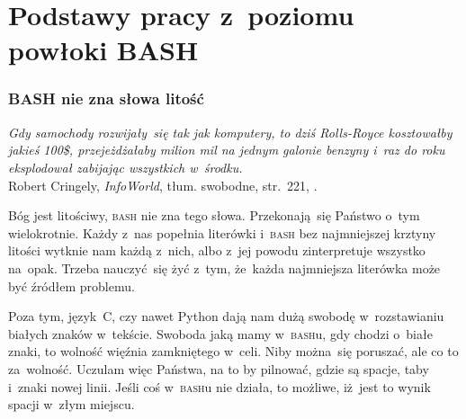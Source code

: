 \documentclass[10pt,t]{beamer}
\begin{document}
\section{Podstawy pracy z~poziomu powłoki BASH}



\begin{frame}
  \frametitle{BASH nie zna słowa litość}


  \textit{Gdy samochody rozwijały~się tak jak komputery, to dziś
    Rolls-Royce kosztowałby jakieś 100\$, przejeżdżałaby milion mil na
    jednym galonie benzyny i~raz do roku eksplodował zabijając wszystkich
    w~środku.} \\
  Robert Cringely, \textit{InfoWorld}, tłum. swobodne, str.~221,
  \parencite{Garfinkel-Weise-Strassmann-The-UNIX-HATERS-Handbook-Pub-1994}.

  Bóg jest litościwy, \textsc{bash} nie zna tego słowa. Przekonają~się
  Państwo o~tym wielokrotnie. Każdy z~nas popełnia literówki i~\textsc{bash}
  bez najmniejszej krztyny litości wytknie nam każdą z~nich, albo
  z~jej powodu zinterpretuje wszystko na~opak. Trzeba nauczyć~się
  żyć z~tym, że~każda najmniejsza literówka może być źródłem problemu.

  Poza tym, język~C, czy nawet Python dają nam dużą swobodę w~rozstawianiu
  białych znaków w~tekście. Swoboda jaką mamy w~\textsc{bash}u, gdy chodzi
  o~białe znaki, to wolność więźnia zamkniętego w~celi. Niby można~się
  poruszać, ale co to za~wolność. Uczulam więc Państwa, na to by pilnować,
  gdzie są spacje, taby i~znaki nowej linii. Jeśli coś w~\textsc{bash}u
  nie działa, to możliwe, iż~jest to wynik spacji w~złym miejscu.

\end{frame}
\end{document}

